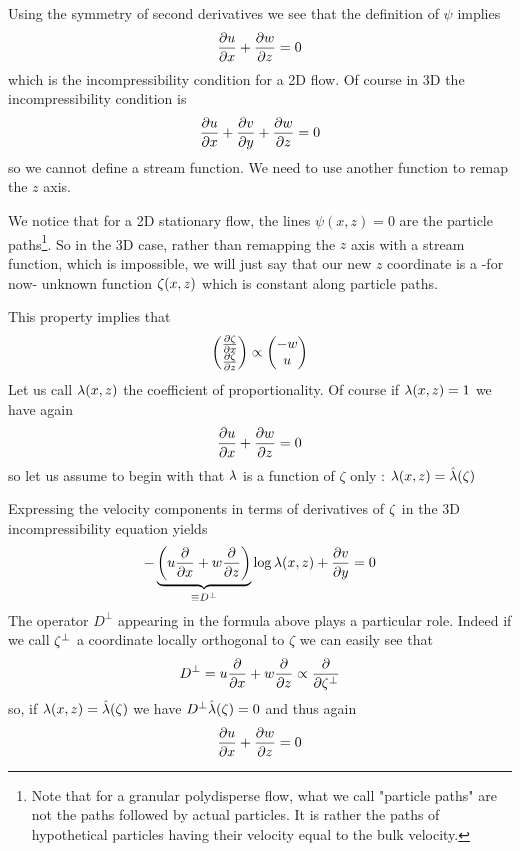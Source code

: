 Using the symmetry of second derivatives we see that the definition of $\psi$ implies
\begin{equation}
	\frac{\partial {u}}{\partial {x}} + \frac{\partial {w}}{\partial {z}} = 0
\end{equation}
which is the incompressibility condition for a 2D flow. Of course in 3D the incompressibility condition is
\begin{equation}
	\frac{\partial {u}}{\partial {x}} + \frac{\partial {v}}{\partial {y}} + \frac{\partial {w}}{\partial {z}} = 0
\end{equation}
so we cannot define a stream function.
We need to use another function to remap the $z$ axis.

We notice that for a 2D stationary flow, the lines $\psi(x,z) = 0$ are the particle paths\footnote{Note that for a granular polydisperse flow, what we call "particle paths" are not the paths followed by actual particles. It is rather  the paths of hypothetical particles having their velocity equal to the bulk velocity.}.
So in the 3D case, rather than remapping the $z$ axis with a stream function, which is impossible, we will just say that our new $z$ coordinate is a -for now- unknown function $\zeta(x,z)$ which is constant along particle paths.

This property implies that
\begin{equation}
	\begin{pmatrix}
	\frac{\partial {\ensuremath{\zeta}}}{\partial {x}}\\
	\frac{\partial {\ensuremath{\zeta}}}{\partial {z}} 
\end{pmatrix}
\propto
	\begin{pmatrix}
	-w\\
	u 
\end{pmatrix}
\end{equation}
Let us call $\lambda(x,z)$ the coefficient of proportionality. Of course if $\lambda(x,z) = 1$ we have again
\begin{equation}
	\frac{\partial {u}}{\partial {x}} + \frac{\partial {w}}{\partial {z}} = 0
\end{equation}
so let us assume to begin with that $\lambda$ is a function of $\zeta$ only : $\lambda(x,z) = \hat{\lambda}(\zeta)$

Expressing the velocity components in terms of derivatives of $\zeta$ in the 3D incompressibility equation yields
\begin{equation} \label{eq:lambda}
	- \underbrace{  \left( u \frac{\partial {}}{\partial {x}} + w\frac{\partial {}}{\partial {z}}\right) }_{\equiv D^\perp}  \log \lambda(x,z) + \frac{\partial {v}}{\partial {y}} = 0
\end{equation}
The operator $D^\perp$ appearing in the formula above plays a particular role.
Indeed if we call $\zeta^\perp$ a coordinate locally orthogonal to $\zeta$ we can easily see that
\begin{equation}
	D^\perp = u \frac{\partial {}}{\partial {x}} + w\frac{\partial {}}{\partial {z}} \propto \frac{\partial {}}{\partial {\ensuremath{\zeta^\perp}}}
\end{equation}
so, if $\lambda(x,z) = \hat{\lambda}(\zeta)$ we have $D^\perp \hat {\lambda}(\zeta) = 0$ and thus again
\begin{equation}
	\frac{\partial {u}}{\partial {x}} + \frac{\partial {w}}{\partial {z}} = 0
\end{equation}

